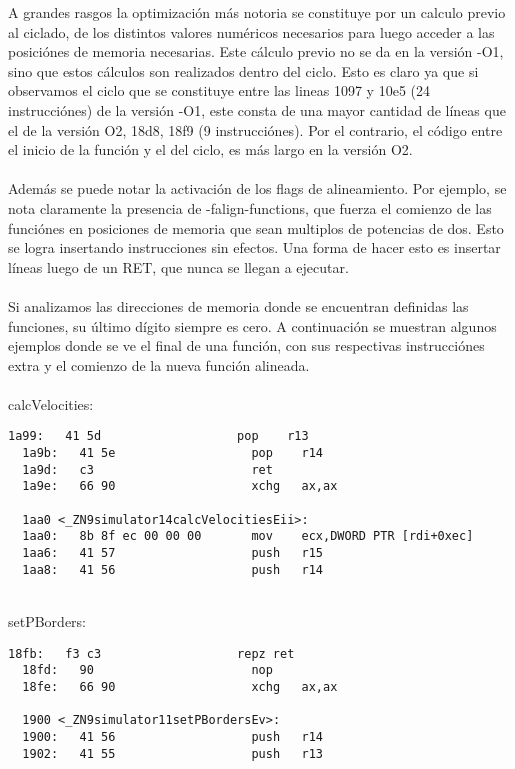 A grandes rasgos la optimización más notoria se constituye por un calculo previo al ciclado, de los distintos valores numéricos necesarios para luego acceder a las posiciónes de memoria necesarias. Este cálculo previo no se da en la versión -O1, sino que estos cálculos son realizados dentro del ciclo. Esto es claro ya que si observamos el ciclo que se constituye entre las lineas 1097 y 10e5 (24 instrucciónes) de la versión -O1, este consta de una mayor cantidad de líneas que el de la versión O2, 18d8, 18f9 (9 instrucciónes). Por el contrario, el código entre el inicio de la función y el del ciclo, es más largo en la versión O2. 
~\\
~\\

Además se puede notar la activación de los flags de alineamiento. Por ejemplo, se nota claramente la presencia de -falign-functions, que fuerza el comienzo de las funciónes en posiciones de memoria que sean multiplos de potencias de dos. Esto se logra insertando instrucciones sin efectos. Una forma de hacer esto es insertar líneas luego de un RET, que nunca se llegan a ejecutar. 
~\\
~\\

Si analizamos las direcciones de memoria donde se encuentran definidas las funciones, su último dígito siempre es cero. A continuación se muestran algunos ejemplos donde se ve el final de una función, con sus respectivas instrucciónes extra y el comienzo de la nueva función alineada.
~\\
~\\
calcVelocities:
\begin{lstlisting}[]
  1a99:   41 5d                   pop    r13
  1a9b:   41 5e                   pop    r14
  1a9d:   c3                      ret    
  1a9e:   66 90                   xchg   ax,ax

  1aa0 <_ZN9simulator14calcVelocitiesEii>:
  1aa0:   8b 8f ec 00 00 00       mov    ecx,DWORD PTR [rdi+0xec]
  1aa6:   41 57                   push   r15
  1aa8:   41 56                   push   r14
\end{lstlisting}
~\\
setPBorders:
\begin{lstlisting}[]
  18fb:   f3 c3                   repz ret 
  18fd:   90                      nop
  18fe:   66 90                   xchg   ax,ax

  1900 <_ZN9simulator11setPBordersEv>:
  1900:   41 56                   push   r14
  1902:   41 55                   push   r13
\end{lstlisting}

